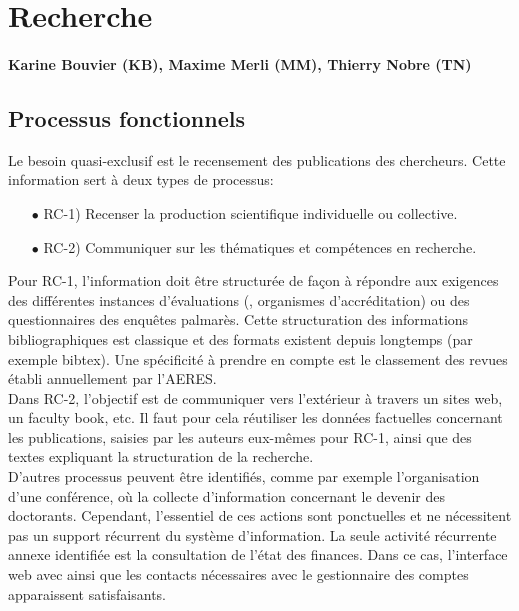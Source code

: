 \documentclass{book}
\begin{document}
\section{Recherche}
\paragraph{Karine Bouvier (KB), Maxime Merli (MM), Thierry Nobre (TN)}

\subsection{Processus fonctionnels}

Le besoin quasi-exclusif est le recensement des publications des chercheurs.
Cette information sert à deux types de processus:
\begin{itemize}
\item[$\bullet$] RC-1) Recenser la production scientifique individuelle ou 
		     collective.
\item[$\bullet$] RC-2) Communiquer sur les thématiques et compétences 
		     en recherche.
\end{itemize}

\bigskip
Pour RC-1, l'information doit être structurée de façon à répondre aux 
exigences des différentes instances d'évaluations (, organismes 
d'accréditation) ou des questionnaires des enquêtes palmarès.
Cette structuration des informations bibliographiques est classique et des
formats existent depuis longtemps (par exemple bibtex). Une spécificité
à prendre en compte est le classement des revues établi annuellement par 
l'AERES.\\

Dans  RC-2, l'objectif est de communiquer vers l'extérieur à travers un 
sites web, un faculty book, etc. Il faut pour cela réutiliser les données
factuelles concernant les publications, saisies par les auteurs eux-mêmes
pour RC-1, ainsi que des textes expliquant la structuration de la recherche.\\

D'autres processus peuvent être identifiés, comme par exemple l'organisation
d'une conférence, où la collecte d'information concernant le devenir des
doctorants. Cependant, l'essentiel de ces actions sont ponctuelles et ne 
nécessitent pas un support récurrent du système d'information. La seule 
activité récurrente annexe identifiée est la consultation de l'état des 
finances. Dans ce cas, l'interface web avec  ainsi que les 
contacts nécessaires avec le gestionnaire des comptes apparaissent satisfaisants.
\end{document}
